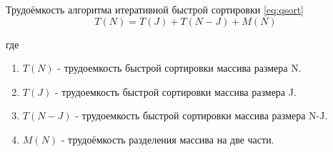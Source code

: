 Трудоёмкость алгоритма итеративной быстрой сортировки \eqref{eq:qsort}
\begin{equation}
    \label{eq:qsort}
    T(N) = T(J) + T(N-J) + M(N)
\end{equation}

где

\begin{enumerate}
    \item $T(N)$ - трудоемкость быстрой сортировки массива размера N.
    \item $T(J)$ - трудоемкость быстрой сортировки массива размера J.
    \item $T(N-J)$ - трудоемкость быстрой сортировки массива размера N-J.
    \item $M(N)$ - трудоёмкость разделения массива на две части.
\end{enumerate}

